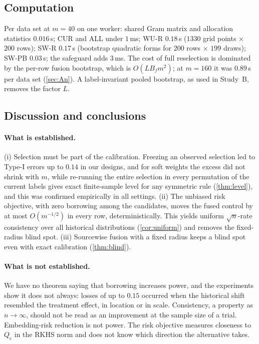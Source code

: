 \subsection{Computation}\label{sec:comp}

Per data set at $m=40$ on one worker: shared Gram matrix and allocation statistics $0.016$\,s; CUR and ALL under $1$\,ms; WU-R $0.18$\,s ($1330$ grid points $\times$ $200$ rows); SW-R $0.17$\,s (bootstrap quadratic forms for $200$ rows $\times$ $199$ draws); SW-PB $0.03$\,s; the safeguard adds $3$\,ms. The cost of full reselection is dominated by the per-row fusion bootstrap, which is $O(L B_f m^2)$; at $m=160$ it was $0.89$\,s per data set (\cref{sec:An}). A label-invariant pooled bootstrap, as used in Study~B, removes the factor $L$.

\subsection{Discussion and conclusions}\label{sec:discussion}

\paragraph{What is established.} (i) Selection must be part of the calibration. Freezing an observed selection led to Type-I errors up to $0.14$ in our designs, and for soft weights the excess did not shrink with $m$, while re-running the entire selection in every permutation of the current labels gives exact finite-sample level for any symmetric rule (\cref{thm:level}), and this was confirmed empirically in all settings. (ii) The unbiased risk objective, with zero borrowing among the candidates, moves the fused control by at most $O(m^{-1/2})$ in every row, deterministically. This yields uniform $\sqrt n$-rate consistency over all historical distributions (\cref{cor:uniform}) and removes the fixed-radius blind spot. (iii) Sourcewise fusion with a fixed radius keeps a blind spot even with exact calibration (\cref{thm:blind}).

\paragraph{What is not established.} We have no theorem saying that borrowing increases power, and the experiments show it does not always: losses of up to $0.15$ occurred when the historical shift resembled the treatment effect, in location or in scale. Consistency, a property as $n\to\infty$, should not be read as an improvement at the sample size of a trial. Embedding-risk reduction is not power. The risk objective measures closeness to $Q_c$ in the RKHS norm and does not know which direction the alternative takes.

